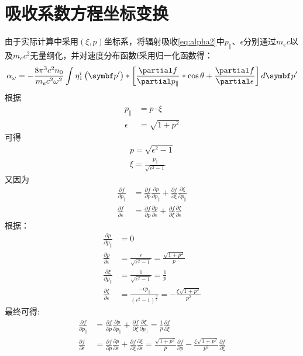 \section{吸收系数方程坐标变换}\label{sec:A2}
由于实际计算中采用$(ξ,p)$坐标系，将辐射吸收\autoref{eq:alpha2}中$p_∥$、$ϵ$分别通过$m_e c$以及$m_e c^2$无量纲化，并对速度分布函数f采用归一化函数得：
\begin{equation}
\alpha_{\omega}=-\frac{8 \pi^{3} c^{2}n_0}{m_{e} c^{2} \omega^{2}} \int \eta_{1}^{i}\left({\vp}^{\prime}\right) *\left[\frac{\partial f}{\partial p_{\|}} * \cos \theta+\frac{\partial f}{\partial \epsilon}\right] d {\vp}^{\prime}
\end{equation}
根据
\begin{equation}
\begin{aligned}
p_{\|} & =p \cdot \xi  \\
\epsilon & =\sqrt{1+p^{2}}
\end{aligned}
\end{equation}
可得
\begin{equation}
\begin{array}{l}
p=\sqrt{\epsilon^{2}-1} \\
\xi=\frac{p_{\|}}{\sqrt{\epsilon^{2}-1}}
\end{array}
\end{equation}
又因为
\begin{align}
\frac{\partial f}{\partial p_{\|}} & = \frac{\partial f}{\partial p} \frac{\partial p}{\partial p_{\|}}+\frac{\partial f}{\partial \xi} \frac{\partial \xi}{\partial p_{\|}} \\
\frac{\partial f}{\partial \epsilon} & = \frac{\partial f}{\partial p} \frac{\partial p}{\partial \epsilon}+\frac{\partial f}{\partial \xi} \frac{\partial \xi}{\partial \epsilon} 
\end{align}
根据：
\begin{equation}
\begin{aligned}\frac{\partial p}{\partial p_{\|}} & =0 \\\frac{\partial p}{\partial \epsilon} & =\frac{\epsilon}{\sqrt{\epsilon^{2}-1}}=\frac{\sqrt{1+p^{2}}}{p} \\\frac{\partial \xi}{\partial p_{\|}} & =\frac{1}{\sqrt{\epsilon^{2}-1}}=\frac{1}{p} \\\frac{\partial \xi}{\partial \epsilon} & =\frac{-\epsilon p_{\|}}{\left(\epsilon^{2}-1\right)^{\frac{3}{2}}}=-\frac{\xi \sqrt{1+p^{2}}}{p^{2}}\end{aligned}
\end{equation}
最终可得:
\begin{align}
\frac{\partial f}{\partial p_{\|}} & = \frac{\partial f}{\partial p} \frac{\partial p}{\partial p_{\|}}+\frac{\partial f}{\partial \xi} \frac{\partial \xi}{\partial p_{\|}}  = \frac{1}{p} \frac{\partial f}{\partial \xi} \\
\frac{\partial f}{\partial \epsilon} & = \frac{\partial f}{\partial p} \frac{\partial p}{\partial \epsilon}+\frac{\partial f}{\partial \xi} \frac{\partial \xi}{\partial \epsilon}  = \frac{\sqrt{1+p^{2}}}{p} \frac{\partial f}{\partial p}-\frac{\xi \sqrt{1+p^{2}}}{p^{2}} \frac{\partial f}{\partial \xi}
\end{align}
